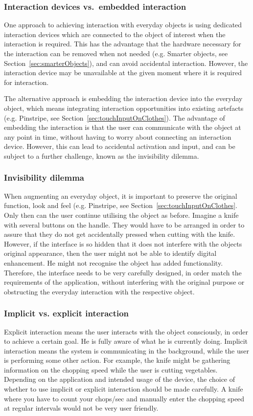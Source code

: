\subsubsection{Interaction devices vs.\ embedded interaction}
One approach to achieving interaction with everyday objects is using dedicated interaction devices which are connected to the object of interest when the interaction is required.
This has the advantage that the hardware necessary for the interaction can be removed when not needed (e.g. Smarter objects, see Section~\ref{sec:smarterObjects}), and can avoid accidental interaction. 
However, the interaction device may be unavailable at the given moment where it is required for interaction.

The alternative approach is embedding the interaction device into the everyday object, which means integrating interaction opportunities into existing artefacts (e.g. Pinstripe, see Section~\ref{sec:touchInputOnClothes}). 
The advantage of embedding the interaction is that the user can communicate with the object at any point in time, without having to worry about connecting an interaction device.
However, this can lead to accidental activation and input, and can be subject to a further challenge, known as the invisibility dilemma.

\subsubsection{Invisibility dilemma}
When augmenting an everyday object, it is important to preserve the original function, look and feel (e.g. Pinstripe, see Section~\ref{sec:touchInputOnClothes}.
Only then can the user continue utilising the object as before. Imagine a knife with several buttons on the handle. They would have to be arranged in order to assure that they do not get accidentally pressed when cutting with the knife.
However, if the interface is so hidden that it does not interfere with the objects original appearance, then the user might not be able to identify digital enhancement.
He might not recognise the object has added functionality.
Therefore, the interface needs to be very carefully designed, in order match the requirements of the application, without interfering with the original purpose or obstructing the everyday interaction with the respective object.

\subsubsection{Implicit vs. explicit interaction}
Explicit interaction means the user interacts with the object consciously, in order to achieve a certain goal.
He is fully aware of what he is currently doing.
Implicit interaction means the system is communicating in the background, while the user is performing some other action.
For example, the knife might be gathering information on the chopping speed while the user is cutting vegetables. Depending on the application and intended usage of the device, the choice of whether to use implicit or explicit interaction should be made carefully.
A knife where you have to count your chops/sec and manually enter the chopping speed at regular intervals would not be very user friendly.

